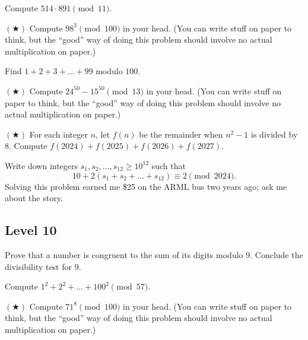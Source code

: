 \documentclass[11pt]{scrartcl}
\begin{document}
\begin{exercise}
	Compute $514 \cdot 891 \pmod{11}$. %
\end{exercise}

\begin{exercise} $(\bigstar)$
	Compute $98^3 \pmod{100}$ in your head. (You can write stuff on paper to think, but the ``good'' way of doing this problem should involve no actual multiplication on paper.) %
\end{exercise}

\begin{exercise}
	Find $1 + 2 + 3 + \dots + 99$ modulo $100$. %
\end{exercise}

\begin{exercise} $(\bigstar)$
	Compute $24^{50} - 15^{50} \pmod{13}$ in your head. (You can write stuff on paper to think, but the ``good'' way of doing this problem should involve no actual multiplication on paper.) %
\end{exercise}

\begin{exercise} $(\bigstar)$
	For each integer $n$, let $f(n)$ be the remainder when $n^2 - 1$ is divided by $8$. Compute $f(2024) + f(2025) + f(2026) + f(2027)$. %
\end{exercise}

\begin{exercise}
    Write down integers $s_1,s_2,\dots,s_{12} \ge 10^{12}$ such that
    \[10 + 2(s_1 + s_2 + \dots + s_{12}) \equiv 2 \pmod{2024}.\]
	Solving this problem earned me \$25 on the ARML bus two years ago; ask me about the story.
\end{exercise}

\subsection{Level 10}

\begin{exercise}
	Prove that a number is congruent to the sum of its digits modulo $9$. Conclude the divisibility test for $9$.
\end{exercise}

\begin{exercise}
	Compute $1^2 + 2^2 + \dots + 100^2 \pmod{57}$. %
\end{exercise}

\begin{exercise} $(\bigstar)$
	Compute $71^8 \pmod{100}$ in your head. (You can write stuff on paper to think, but the ``good'' way of doing this problem should involve no actual multiplication on paper.) %
\end{exercise}
\end{document}
